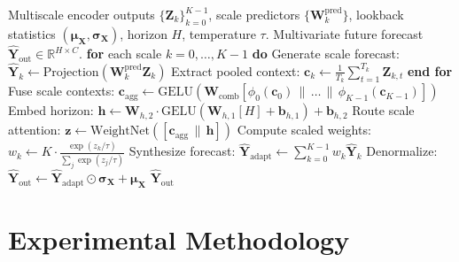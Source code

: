 \documentclass[journal]{IEEEtran}
\begin{document}
\begin{algorithm}[t]
\caption{Adaptive-FMM Decoding Procedure}
\label{alg:adaptive_fmm}
\begin{algorithmic}[1]
\REQUIRE Multiscale encoder outputs $\{\mathbf{Z}_k\}_{k=0}^{K-1}$, scale predictors $\{\mathbf{W}_k^{\text{pred}}\}$, lookback statistics $(\boldsymbol{\mu}_{\mathbf{X}}, \boldsymbol{\sigma}_{\mathbf{X}})$, horizon $H$, temperature $\tau$.
\ENSURE Multivariate future forecast $\hat{\mathbf{Y}}_{\text{out}} \in \mathbb{R}^{H \times C}$.
\STATE \textbf{for} each scale $k = 0, \dots, K-1$ \textbf{do}
\STATE \quad Generate scale forecast: $\hat{\mathbf{Y}}_k \leftarrow \text{Projection}(\mathbf{W}_k^{\text{pred}} \mathbf{Z}_k)$
\STATE \quad Extract pooled context: $\mathbf{c}_k \leftarrow \frac{1}{T_k} \sum_{t=1}^{T_k} \mathbf{Z}_{k,t}$
\STATE \textbf{end for}
\STATE Fuse scale contexts: $\mathbf{c}_{\text{agg}} \leftarrow \text{GELU}(\mathbf{W}_{\text{comb}} [\phi_0(\mathbf{c}_0) \,\|\, \dots \,\|\, \phi_{K-1}(\mathbf{c}_{K-1})])$
\STATE Embed horizon: $\mathbf{h} \leftarrow \mathbf{W}_{h,2} \cdot \text{GELU}(\mathbf{W}_{h,1} [H] + \mathbf{b}_{h,1}) + \mathbf{b}_{h,2}$
\STATE Route scale attention: $\mathbf{z} \leftarrow \text{WeightNet}([\mathbf{c}_{\text{agg}} \,\|\, \mathbf{h}])$
\STATE Compute scaled weights: $w_k \leftarrow K \cdot \frac{\exp(z_k / \tau)}{\sum_j \exp(z_j / \tau)}$
\STATE Synthesize forecast: $\hat{\mathbf{Y}}_{\text{adapt}} \leftarrow \sum_{k=0}^{K-1} w_k \hat{\mathbf{Y}}_k$
\STATE Denormalize: $\hat{\mathbf{Y}}_{\text{out}} \leftarrow \hat{\mathbf{Y}}_{\text{adapt}} \odot \boldsymbol{\sigma}_{\mathbf{X}} + \boldsymbol{\mu}_{\mathbf{X}}$
\RETURN $\hat{\mathbf{Y}}_{\text{out}}$
\end{algorithmic}
\end{algorithm}

\section{Experimental Methodology}
\label{sec:experiments}
\end{document}
